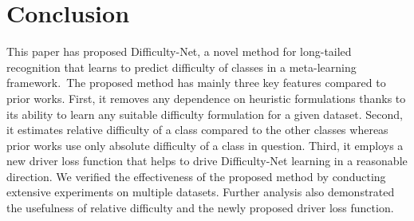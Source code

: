 \documentclass[10pt,twocolumn,letterpaper]{article}
\begin{document}
\section{Conclusion}






This paper has proposed Difficulty-Net, a novel method for long-tailed recognition that learns to predict difficulty of classes in a meta-learning framework.~The proposed method has mainly three key features compared to prior works. First,  it removes any dependence on heuristic formulations thanks to its ability to learn any suitable difficulty formulation for a given dataset. Second, it estimates relative difficulty of a class compared to the other classes whereas prior works use only absolute difficulty of a class in question. Third, it employs a new driver loss function that helps to drive Difficulty-Net learning in a reasonable direction. We verified the effectiveness of the proposed method by conducting extensive experiments on multiple datasets. Further analysis also demonstrated the usefulness of relative difficulty and the newly proposed driver loss function.





{\small


}
\end{document}
